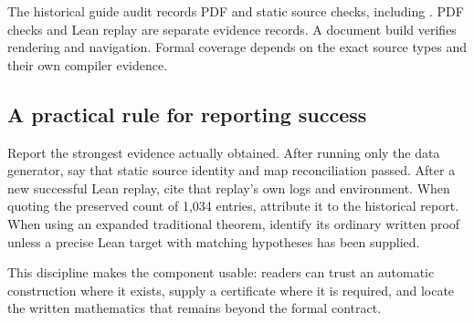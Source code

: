 The historical guide audit records PDF and static source checks, including . PDF checks and Lean replay are separate evidence records. A document build verifies rendering and navigation. Formal coverage depends on the exact source types and their own compiler evidence.

\subsection{A practical rule for reporting success}

Report the strongest evidence actually obtained. After running only the data generator, say that static source identity and map reconciliation passed. After a new successful Lean replay, cite that replay's own logs and environment. When quoting the preserved count of 1,034 entries, attribute it to the historical report. When using an expanded traditional theorem, identify its ordinary written proof unless a precise Lean target with matching hypotheses has been supplied.

This discipline makes the component usable: readers can trust an automatic construction where it exists, supply a certificate where it is required, and locate the written mathematics that remains beyond the formal contract.
